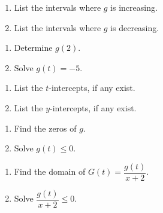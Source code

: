 \begin{multicols}{2}
\begin{enumerate}
\setcounter{enumi}{\value{HW}}

\item  List the intervals where $g$ is increasing.
\item  List the intervals where $g$ is decreasing.

\setcounter{HW}{\value{enumi}}
\end{enumerate}
\end{multicols}


\begin{multicols}{2}
\begin{enumerate}
\setcounter{enumi}{\value{HW}}

\item  Determine $g(2)$.
\item  Solve $g(t) = -5$.

\setcounter{HW}{\value{enumi}}
\end{enumerate}
\end{multicols}

\begin{multicols}{2}
\begin{enumerate}
\setcounter{enumi}{\value{HW}}

\item  List the $t$-intercepts, if any exist.
\item  List the $y$-intercepts, if any exist.

\setcounter{HW}{\value{enumi}}
\end{enumerate}
\end{multicols}

\begin{multicols}{2}
\begin{enumerate}
\setcounter{enumi}{\value{HW}}

\item  Find the zeros of $g$.
\item  Solve $g(t) \leq 0$.

\setcounter{HW}{\value{enumi}}
\end{enumerate}
\end{multicols}

\begin{multicols}{2}
\begin{enumerate}
\setcounter{enumi}{\value{HW}}

\item  Find the domain of $G(t) = \dfrac{g(t)}{x+2}$.
\item  Solve $\dfrac{g(t)}{x+2} \leq 0$.

\setcounter{HW}{\value{enumi}}
\end{enumerate}
\end{multicols}

